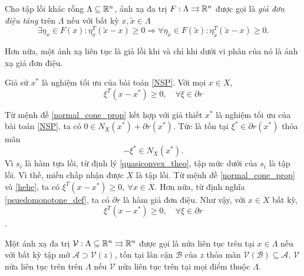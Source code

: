 \begin{dn}
    \label{psuedomonotone_def}
    Cho tập lồi khác rỗng $\Lambda \subseteq \mathbb{R}^n$, ánh xạ đa trị $F: \Lambda \rightrightarrows \mathbb{R}^n$ được gọi là \textit{giả đơn điệu tăng} trên $\Lambda$ nếu với bất kỳ $x, \tilde{x} \in \Lambda$
    \begin{equation*}
        \exists \eta_x \in F(x): \eta_x^T (\tilde{x} - x) \geq 0 \Rightarrow \forall \eta_{\tilde{x}} \in F(\tilde{x}): \eta_{\tilde{x}}^T (\tilde{x} - x) \geq 0.
    \end{equation*} 
\end{dn}
Hơn nữa, một ánh xạ liên tục là giả lồi khi và chỉ khi dưới vi phân của nó là ánh xạ giả đơn điệu.
\begin{bd}
    \label{opimal_solution_lemma}
    Giả sử $x^*$ là nghiệm tối ưu của bài toán \eqref{NSP}. Với mọi $x \in X$,
    \begin{equation*}
        \xi^T (x - x^*) \geq 0, \quad \forall \xi \in \partial r
    \end{equation*}
\end{bd}
\begin{cm}
    Từ mệnh đề \ref{normal_cone_prop} kết hợp với giả thiết $x^*$ là nghiệm tối ưu của bài toán \eqref{NSP}, ta có $0 \in N_X(x^*) + \partial r(x^*)$. Tức là tồn tại $\xi^* \in \partial r(x^*)$ thỏa mãn
    \begin{equation} \label{hehe}
        -\xi^* \in N_X(x^*).
    \end{equation} 
    Vì $s_i$ là hàm tựa lồi, từ định lý \ref{quasiconvex_theo}, tập mức dưới của $s_i$ là tập lồi. Vì thế, miền chấp nhận được $X$ là tập lồi. Từ mệnh đề \ref{normal_cone_prop} và \eqref{hehe}, ta có $\xi^T (x - x^*) \geq 0,\ \forall x \in X$. Hơn nữa, từ định nghĩa \ref{psuedomonotone_def}, ta có $\partial r$ là hàm giả đơn điệu. Như vậy, với $x \in X$ bất kỳ, 
    $$ \xi^T(x - x^*)  \geq 0, \quad \forall \xi \in \partial r$$.
\end{cm}

\begin{dn}
    Một ánh xạ đa trị $\mathcal{V}: \Lambda \subseteq \mathbb{R}^n \rightrightarrows \mathbb{R}^n$ được gọi là nửa liên tục trên tại $x \in \Lambda$ nếu với bất kỳ tập mở $\mathcal{A} \supset \mathcal{V}(z)$, tồn tại lân cận $\mathcal{B}$ của $z$ thỏa mãn $\mathcal{V}(\mathcal{B}) \subseteq \mathcal{A}$. $\mathcal{V}$ nửa liên tục trên trên $\Lambda$ nếu $\mathcal{V}$ nửa liên tục trên tại mọi điểm thuộc $\Lambda$.
\end{dn}
